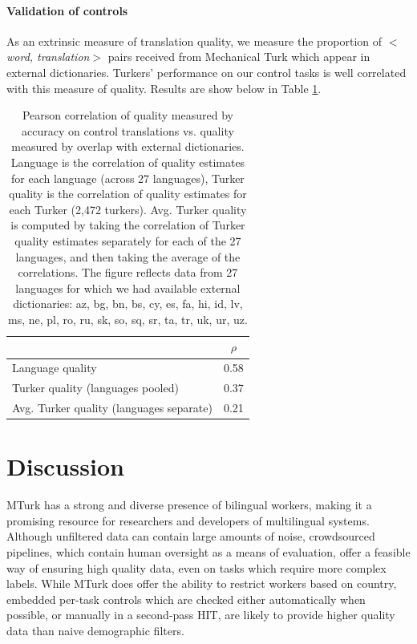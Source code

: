 \documentclass[11pt]{article}
\begin{document}
\paragraph{Validation of controls} As an extrinsic measure of translation quality, we measure the proportion of $<${\it word, translation}$>$ pairs received from Mechanical Turk which appear in external dictionaries. Turkers' performance on our control tasks is well correlated with this measure of quality. Results are show below in Table \ref{corr-table}. 

\begin{table}[h]
\centering
\begin{tabular}{lc}
&$\rho$\\
\hline\hline
Language quality&0.58\\
Turker quality (languages pooled)&0.37\\
Avg. Turker quality (languages separate)&0.21\\
\hline\hline
\end{tabular}
\caption{Pearson correlation of quality measured by accuracy on control translations vs. quality measured by overlap with external dictionaries. Language is the correlation of quality estimates for each language (across 27 languages), Turker quality is the correlation of quality estimates for each Turker (2,472 turkers). Avg. Turker quality is computed by taking the correlation of Turker quality estimates separately for each of the 27 languages, and then taking the average of the correlations. The figure reflects data from 27 languages for which we had available external dictionaries: az, bg, bn, bs, cy, es, fa, hi, id, lv, ms, ne, pl, ro, ru, sk, so, sq, sr, ta, tr, uk, ur, uz.}
\label{corr-table}
\end{table}




\section{Discussion}
MTurk has a strong and diverse presence of bilingual workers, making it a promising resource for researchers and developers of multilingual systems. Although unfiltered data can contain large amounts of noise, crowdsourced pipelines, which contain human oversight as a means of evaluation, offer a feasible way of ensuring high quality data, even on tasks which require more complex labels. While MTurk does offer the ability to restrict workers based on country, embedded per-task controls which are checked either automatically when possible, or manually in a second-pass HIT, are likely to provide higher quality data than naive demographic filters. 
\end{document}
